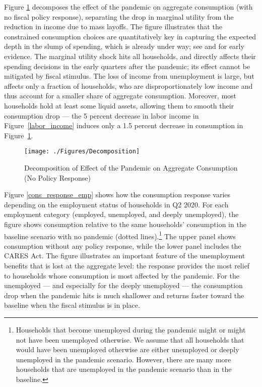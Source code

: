 \documentclass[titlepage,letterpaper]{\econtex}
\begin{document}
Figure \ref{cons_response2} decomposes the effect of the pandemic on aggregate consumption (with no fiscal policy response), separating the drop in marginal utility from the reduction in income due to mass layoffs.
The figure illustrates that the constrained consumption choices are quantitatively key in capturing the expected depth in the slump of spending, which is already under way; see \cite{baker_Cpandemic} and \cite{nyFedCoronaBlog} for early evidence.
The marginal utility shock hits all households, and directly affects their spending decisions in the early quarters after the pandemic; its effect cannot be mitigated by fiscal stimulus.
The loss of income from unemployment is large, but affects only a fraction of households, who are disproportionately low income and thus account for a smaller share of aggregate consumption.
Moreover, most households hold at least some liquid assets, allowing them to smooth their consumption drop --- the 5 percent  decrease in labor income in Figure~\ref{labor_income} induces only a 1.5 percent decrease in consumption in Figure~\ref{cons_response2}.

\begin{figure}
  \centering
  \caption{Decomposition of Effect of the Pandemic on Aggregate Consumption (No Policy Response)}
  \label{cons_response2}
  { \texttt{[image: ./Figures/Decomposition]}}
\end{figure}

Figure \ref{cons_response_emp} shows how the consumption response varies depending on the employment status of households in Q2 2020.
For each employment category (employed, unemployed, and deeply unemployed), the figure shows consumption relative to the same households' consumption in the baseline scenario with no pandemic (dotted lines).\footnote{Households that become unemployed during the pandemic might or might not have been unemployed otherwise. We assume that all households that would have been unemployed otherwise are either unemployed or deeply unemployed in the pandemic scenario. However, there are many more households that are unemployed in the pandemic scenario than in the baseline.}
The upper panel shows consumption without any policy response, while the lower panel includes the CARES Act.
The figure illustrates an important feature of the unemployment benefits that is lost at the aggregate level: the response provides the most relief to households whose consumption is most affected by the pandemic.
For the unemployed --- and especially for the deeply unemployed --- the consumption drop when the pandemic hits is much shallower and returns faster toward the baseline when the fiscal stimulus is in place.
\end{document}
